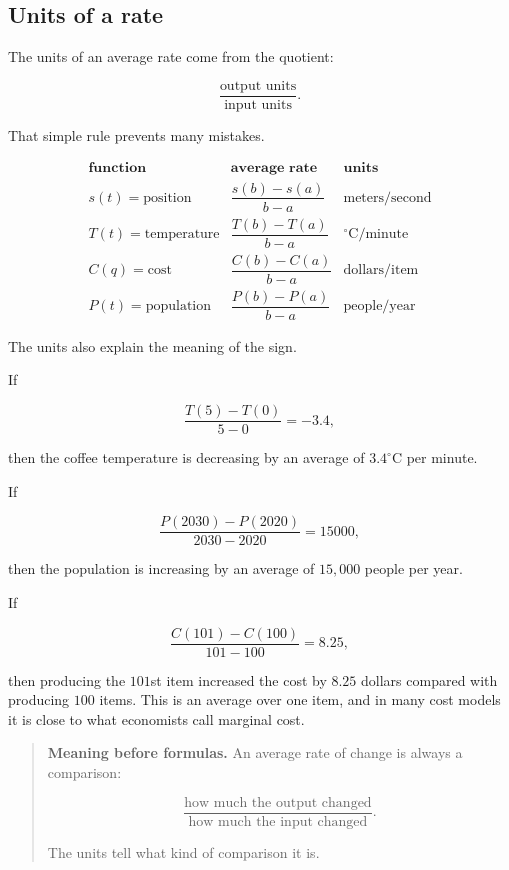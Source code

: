 \subsection{Units of a rate}
\label{subsec:units-of-rate}

The units of an average rate come from the quotient:

\[
\frac{\text{output units}}{\text{input units}}.
\]

That simple rule prevents many mistakes.

\[
\begin{array}{c|c|c}
\textbf{function} & \textbf{average rate} & \textbf{units} \\ \hline
s(t)=\text{position} & \dfrac{s(b)-s(a)}{b-a} & \text{meters/second} \\[8pt]
T(t)=\text{temperature} & \dfrac{T(b)-T(a)}{b-a} & ^\circ\text{C/minute} \\[8pt]
C(q)=\text{cost} & \dfrac{C(b)-C(a)}{b-a} & \text{dollars/item} \\[8pt]
P(t)=\text{population} & \dfrac{P(b)-P(a)}{b-a} & \text{people/year}
\end{array}
\]

The units also explain the meaning of the sign.

If

\[
\frac{T(5)-T(0)}{5-0}=-3.4,
\]

then the coffee temperature is decreasing by an average of \(3.4^\circ\text{C}\) per minute.

If

\[
\frac{P(2030)-P(2020)}{2030-2020}=15000,
\]

then the population is increasing by an average of \(15{,}000\) people per year.

If

\[
\frac{C(101)-C(100)}{101-100}=8.25,
\]

then producing the \(101\)st item increased the cost by \(8.25\) dollars compared with producing \(100\) items.  This is an average over one item, and in many cost models it is close to what economists call marginal cost.

\begin{quote}
\textbf{Meaning before formulas.}
An average rate of change is always a comparison:

\[
\frac{\text{how much the output changed}}{\text{how much the input changed}}.
\]

The units tell what kind of comparison it is.
\end{quote}

